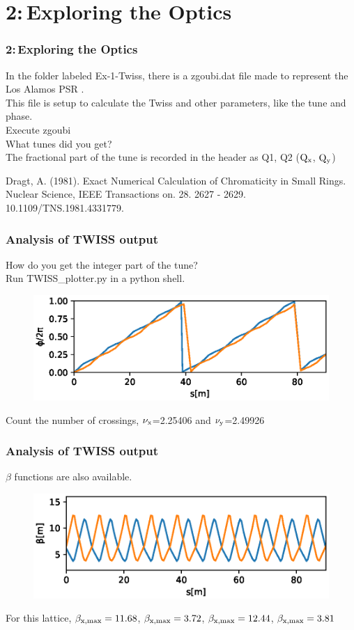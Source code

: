 \documentclass{beamer}
\begin{document}
\section{2:\,Exploring the Optics}

\begin{frame}
\frametitle{2:\,Exploring the Optics}
In the folder labeled Ex-1-Twiss, there is a zgoubi.dat file made to represent the Los Alamos PSR \cite{AD1}.\\
This file is setup to calculate the Twiss and other parameters, like the tune and phase.\\ 
Execute zgoubi\\
What tunes did you get?\\
\hspace*{1em}The fractional part of the tune is recorded in the header as Q1, Q2 ($\rm Q_x$, $\rm Q_y$)
\vfill

\footnoterule
\tiny
\cite{AD1} Dragt, A. (1981). Exact Numerical Calculation of Chromaticity in Small Rings. Nuclear Science, IEEE Transactions on. 28. 2627 - 2629. 10.1109/TNS.1981.4331779. 
\end{frame}
\begin{frame}
\frametitle{Analysis of TWISS output}
How do you get the integer part of the tune?\\
Run TWISS\_plotter.py in a python shell.
\begin{figure}
\includegraphics[width=1.0\textwidth]{phi.eps}
\end{figure}
Count the number of crossings, $\rm \nu_x$=2.25406 and $\rm \nu_y$=2.49926\\
\end{frame}
\begin{frame}
\frametitle{Analysis of TWISS output}
$\beta$ functions are also available.
\begin{figure}
\includegraphics[width=1.0\textwidth]{beta.eps}
\end{figure}
For this lattice, $\rm \beta_{x,max}=11.68$, $\rm \beta_{x,max}=3.72$, $\rm \beta_{x,max}=12.44$, $\rm \beta_{x,max}=3.81$
\end{frame}
\end{document}
